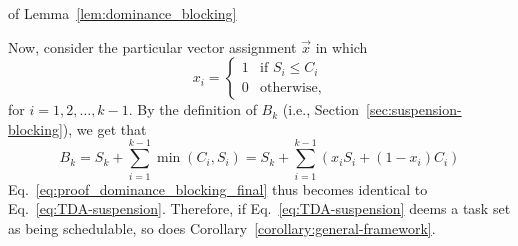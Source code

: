 \begin{appProof}{of Lemma~\ref{lem:dominance_blocking}}
    
    Now, consider the particular vector assignment $\vec{x}$ in which 
  \begin{equation*}
    x_i =
    \begin{cases}
      1 &\mbox{if } S_i \leq    C_i\\
      0 & \mbox{otherwise},
    \end{cases}
  \end{equation*}
  for $i=1,2,\ldots,k-1$. 
    By the definition of $B_k$ (i.e., Section~\ref{sec:suspension-blocking}), we get that 
    $$B_k = S_k + \sum_{i=1}^{k-1} \min(C_i, S_i) = S_k + \sum_{i=1}^{k-1} \left(x_i
    S_i + (1-x_i) C_i\right)$$
Eq.~\eqref{eq:proof_dominance_blocking_final} thus becomes identical to Eq.~\eqref{eq:TDA-suspension}. Therefore, if Eq.~\eqref{eq:TDA-suspension} deems a task set as being schedulable, so does Corollary~\ref{corollary:general-framework}. 
\end{appProof}

